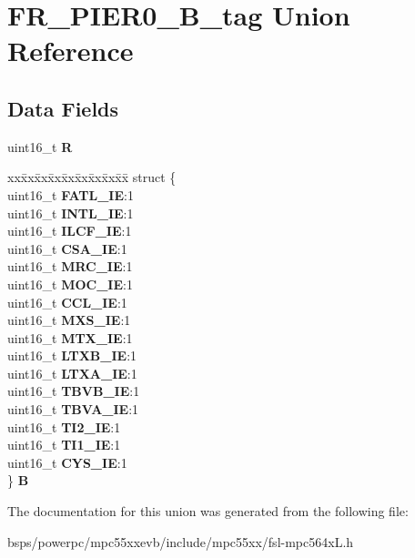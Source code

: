 \hypertarget{unionFR__PIER0__16B__tag}{}\section{F\+R\+\_\+\+P\+I\+E\+R0\+\_\+B\+\_\+tag Union Reference}
\label{unionFR__PIER0__16B__tag}
\subsection*{Data Fields}
\begin{DoxyCompactItemize}
\item 
\mbox{\label{unionFR__PIER0__16B__tag_ae4772878d605f4a1d6231b089dd23841}} 
uint16\+\_\+t {\bfseries R}
\item 
\mbox{\label{unionFR__PIER0__16B__tag_a6bd3604dc993b8d0fead38c45f56d915}} 
\begin{tabbing}
xx\=xx\=xx\=xx\=xx\=xx\=xx\=xx\=xx\=\kill
struct \{\\
\>uint16\_t {\bfseries FATL\_IE}:1\\
\>uint16\_t {\bfseries INTL\_IE}:1\\
\>uint16\_t {\bfseries ILCF\_IE}:1\\
\>uint16\_t {\bfseries CSA\_IE}:1\\
\>uint16\_t {\bfseries MRC\_IE}:1\\
\>uint16\_t {\bfseries MOC\_IE}:1\\
\>uint16\_t {\bfseries CCL\_IE}:1\\
\>uint16\_t {\bfseries MXS\_IE}:1\\
\>uint16\_t {\bfseries MTX\_IE}:1\\
\>uint16\_t {\bfseries LTXB\_IE}:1\\
\>uint16\_t {\bfseries LTXA\_IE}:1\\
\>uint16\_t {\bfseries TBVB\_IE}:1\\
\>uint16\_t {\bfseries TBVA\_IE}:1\\
\>uint16\_t {\bfseries TI2\_IE}:1\\
\>uint16\_t {\bfseries TI1\_IE}:1\\
\>uint16\_t {\bfseries CYS\_IE}:1\\
\} {\bfseries B}\\

\end{tabbing}\end{DoxyCompactItemize}


The documentation for this union was generated from the following file\+:\begin{DoxyCompactItemize}
\item 
bsps/powerpc/mpc55xxevb/include/mpc55xx/fsl-\/mpc564x\+L.\+h\end{DoxyCompactItemize}
